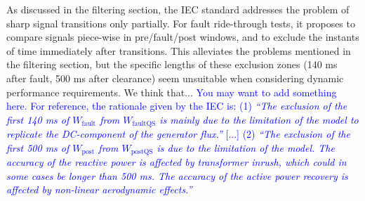 \documentclass[11pt, a4paper, twoside, titlepage]{article}
\begin{document}
As discussed in the filtering section, the IEC standard addresses the problem of
sharp signal transitions only partially. For fault ride-through tests, it
proposes to compare signals piece-wise in pre/fault/post windows, and to exclude
the instants of time immediately after transitions.  This alleviates the
problems mentioned in the filtering section, but the specific lengths of these
exclusion zones (140 ms after fault, 500 ms after clearance) seem unsuitable
when considering dynamic performance requirements. We think
that... \textcolor{blue}{You may want to add something here. For reference, the
  rationale given by the IEC is: (1) \emph{``The exclusion of the first 140 ms
  of $W_\text{fault}$ from $W_\text{faultQS}$ is mainly due to the limitation of
  the model to replicate the DC-component of the generator flux.''} [...] (2)
  \emph{``The exclusion of the first 500 ms of $W_\text{post}$ from
  $W_\text{postQS}$ is due to the limitation of the model. The accuracy of the
  reactive power is affected by transformer inrush, which could in some cases be
  longer than 500 ms. The accuracy of the active power recovery is affected by
  non-linear aerodynamic effects.''}}





 

\end{document}

